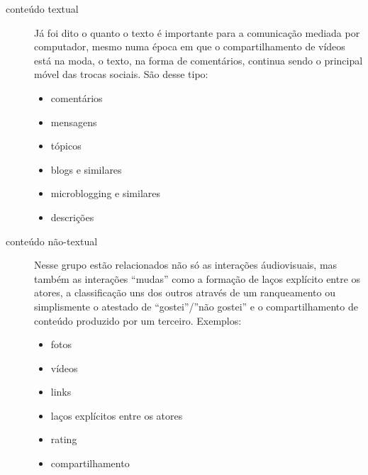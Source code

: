 \documentclass{article}
\begin{document}
\begin{description}
\item[conteúdo textual] Já foi dito o quanto o texto é importante para a
comunicação mediada por computador, mesmo numa época em que o compartilhamento
de vídeos está na moda, o texto, na forma de comentários, continua sendo o
principal móvel das trocas sociais. São desse tipo:
\begin{itemize}
  \item comentários
  \item mensagens
  \item tópicos
  \item blogs e similares
  \item microblogging e similares
  \item descrições
\end{itemize}
\item[conteúdo não-textual] Nesse grupo estão relacionados não só as interações
áudiovisuais, mas também as interações ``mudas'' como a formação de laços
explícito entre os atores, a classificação uns dos outros através de um
ranqueamento ou simplismente o atestado de ``gostei''/''não gostei'' e o
compartilhamento de conteúdo produzido por um terceiro. Exemplos:
\begin{itemize}
  \item fotos
  \item vídeos
  \item links
  \item laços explícitos entre os atores
  \item rating
  \item compartilhamento
\end{itemize}
\end{description}
\end{document}
